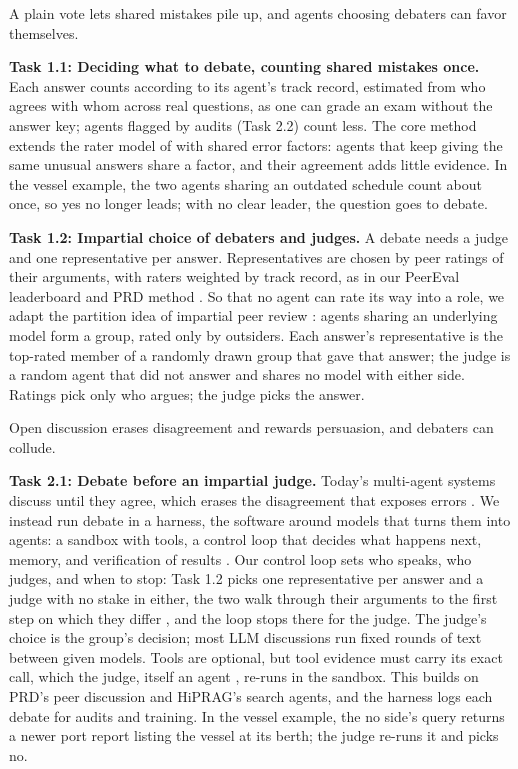 \documentclass[12pt,letterpaper]{article}
\newcommand{\rg}[1]{\par\vspace{3pt}{\normalfont\bfseries\itshape #1}\par\nopagebreak}
\newcommand{\task}[1]{\textbf{#1}\hspace{0.4em}}
\begin{document}
\rg{RG1. Decide what to debate, and pick debaters and judges impartially}
A plain vote lets shared mistakes pile up, and agents choosing debaters can favor themselves.

\task{Task 1.1: Deciding what to debate, counting shared mistakes once.} Each answer counts according to its agent's track record, estimated from who agrees with whom across real questions, as one can grade an exam without the answer key; agents flagged by audits (Task 2.2) count less. The core method extends the rater model of \citet{dawid1979maximum} with shared error factors: agents that keep giving the same unusual answers share a factor, and their agreement adds little evidence. In the vessel example, the two agents sharing an outdated schedule count about once, so yes no longer leads; with no clear leader, the question goes to debate.

\task{Task 1.2: Impartial choice of debaters and judges.} A debate needs a judge and one representative per answer. Representatives are chosen by peer ratings of their arguments, with raters weighted by track record, as in our PeerEval leaderboard and PRD method \citep{li2024prd}. So that no agent can rate its way into a role, we adapt the partition idea of impartial peer review \citep{alon2011sum,kurokawa2015impartial}: agents sharing an underlying model form a group, rated only by outsiders. Each answer's representative is the top-rated member of a randomly drawn group that gave that answer; the judge is a random agent that did not answer and shares no model with either side. Ratings pick only who argues; the judge picks the answer.

\rg{RG2. Settle disputes by agentic debate, and catch collusion}
Open discussion erases disagreement and rewards persuasion, and debaters can collude.

\task{Task 2.1: Debate before an impartial judge.} Today's multi-agent systems discuss until they agree, which erases the disagreement that exposes errors \citep{shu2026unanimity}. We instead run debate in a harness, the software around models that turns them into agents: a sandbox with tools, a control loop that decides what happens next, memory, and verification of results \citep{ning2026harness}. Our control loop sets who speaks, who judges, and when to stop: Task 1.2 picks one representative per answer and a judge with no stake in either, the two walk through their arguments to the first step on which they differ \citep{irving2018debate}, and the loop stops there for the judge. The judge's choice is the group's decision; most LLM discussions run fixed rounds of text between given models. Tools are optional, but tool evidence must carry its exact call, which the judge, itself an agent \citep{zhuge2025agent}, re-runs in the sandbox. This builds on PRD's peer discussion and HiPRAG's search agents, and the harness logs each debate for audits and training. In the vessel example, the no side's query returns a newer port report listing the vessel at its berth; the judge re-runs it and picks no.
\end{document}
